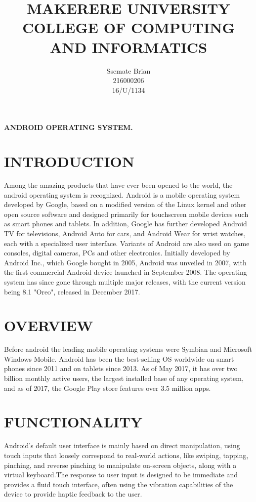 \documentclass[11pt]{article}
\begin{document}
\title{\textbf{MAKERERE UNIVERSITY\\COLLEGE OF COMPUTING AND INFORMATICS\\}}

\author{Ssemate Brian\\216000206\\16/U/1134}
\renewcommand{\today}{}

\maketitle

\newpage


\textbf{ANDROID OPERATING SYSTEM.}
\section*{INTRODUCTION}

Among the amazing products that have ever been opened to the world, the android operating system is recognized. Android is a  mobile operating system developed by Google, based on a modified version of the Linux kernel and other open source software and designed primarily for touchscreen mobile devices such as smart phones and tablets.\cite{s1} In addition, Google has further developed Android TV for televisions, Android Auto for cars, and Android Wear for wrist watches, each with a specialized user interface. Variants of Android are also used on game consoles, digital cameras, PCs and other electronics.
Initially developed by Android Inc., which Google bought in 2005, Android was unveiled in 2007, with the first commercial Android device launched in September 2008. The operating system has since gone through multiple major releases, with the current version being 8.1 "Oreo", released in December 2017.


\section*{OVERVIEW}

Before android the leading mobile operating systems were Symbian and Microsoft Windows Mobile.\cite{s2}\cite{s3}  
Android has been the best-selling OS worldwide on smart phones since 2011 and on tablets since 2013. As of May 2017, it has over two billion monthly active users, the largest installed base of any operating system, and as of 2017, the Google Play store features over 3.5 million apps.\cite{s4}

\section*{FUNCTIONALITY}
Android's default user interface is mainly based on direct manipulation, using touch inputs that loosely correspond to real-world actions, like swiping, tapping, pinching, and reverse pinching to manipulate on-screen objects, along with a virtual keyboard.The response to user input is designed to be immediate and provides a fluid touch interface, often using the vibration capabilities of the device to provide haptic feedback to the user.\cite{s5}


\end{document}
